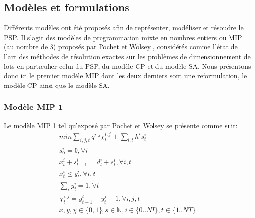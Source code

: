 		\subsection{Modèles et formulations}
		Différents modèles ont été proposés afin de représenter, modéliser et résoudre le PSP. Il s'agit des modèles de programmation mixte en nombres entiers ou MIP (au nombre de 3) proposés par Pochet et Wolsey \cite{pochet_wolsey}, considérés comme l'état de l'art des méthodes de résolution exactes sur les problèmes de dimensionnement de lots en particulier celui du PSP, du modèle CP et du modèle SA. Nous présentons donc ici le premier modèle MIP dont les deux derniers sont une reformulation, le modèle CP ainsi que le modèle SA.
		\subsubsection{Modèle MIP 1}
		
		Le modèle MIP 1 \cite{pochet_wolsey} tel qu'exposé par Pochet et Wolsey se présente comme suit:
		\begin{eqnarray}
			min \sum_{i,j,t} q^{i,j}\chi_{t}^{i,j} + \sum_{i,t} h^{i} s_{t}^{i} \\
			s_{0}^{i} = 0, \forall i \\
			x_{t}^{i} + s_{t-1}^{i} = d_{t}^{i} + s_{t}^{i}, \forall i,t \\
			x_{t}^{i} \leq y_{t}^{i}, \forall i,t \\
			\sum_{i} y_{t}^{i} = 1 , \forall t \\
			\chi_{t}^{i,j} = y_{t-1}^{i} + y_{t}^{j} - 1, \forall i,j,t \\
			x,y,\chi \in \{0,1\}, s \in \mathbb{N}, i \in \{0..NI\}, t \in \{1..NT\}
		\end{eqnarray}
		
